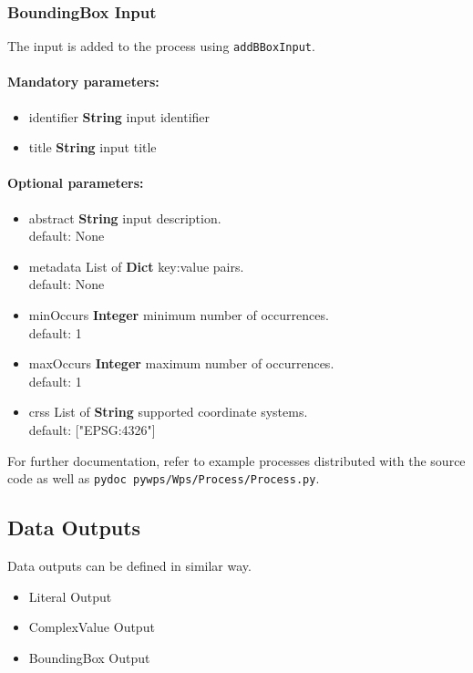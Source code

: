 \documentclass[a4paper,11pt]{report}
\begin{document}
\subsubsection{BoundingBox Input}
The input is added to the process using \texttt{addBBoxInput}.

\paragraph{Mandatory parameters:}
\begin{itemize}
\item identifier \textbf{String} input identifier
\item title \textbf{String} input title
\end{itemize}

\paragraph{Optional parameters:}
\begin{itemize}
\item abstract \textbf{String} input description.\\
        default: None
\item metadata List of \textbf{Dict} {key:value} pairs.\\
        default: None
\item minOccurs \textbf{Integer} minimum number of occurrences.\\
        default: 1
\item maxOccurs \textbf{Integer} maximum number of occurrences.\\
        default: 1
\item crss List of \textbf{String} supported coordinate systems.\\
        default: ["EPSG:4326"]
\end{itemize}

For further documentation, refer to example processes distributed with the
source code as well as \texttt{pydoc~pywps/Wps/Process/Process.py}. 

\subsection{Data Outputs}
Data outputs can be defined in similar way.
\begin{itemize}
    \item Literal Output
    \item ComplexValue Output
    \item BoundingBox Output
\end{itemize}
    
\end{document}
